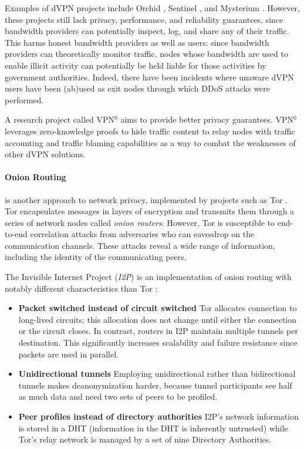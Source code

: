 Examples of dVPN projects include Orchid \cite{orchid}, Sentinel \cite{sentinel}, and Mysterium \cite{mysterium}. However, these projects still lack privacy, performance, and reliability guarantees, since bandwidth providers can potentially inspect, log, and share any of their traffic. This harms honest bandwidth providers as well as users: since bandwidth providers can theoretically monitor traffic, nodes whose bandwidth are used to enable illicit activity can potentially be held liable for those activities by government authorities. Indeed, there have been incidents where unaware dVPN users have been (ab)used as exit nodes through which DDoS attacks
were performed.

A research project called VPN$^0$ \cite{vpn0} aims to provide better privacy guarantees. VPN$^0$ leverages zero-knowledge proofs to hide traffic content to relay nodes with traffic accounting and traffic blaming capabilities as a way to combat the weaknesses of other dVPN solutions.

\paragraph{Onion Routing} is another approach to network privacy, implemented by projects such as Tor \cite{tor}. Tor encapsulates messages in layers of encryption and transmits them through a series of network nodes called \textit{onion routers}. However, Tor is susceptible to end-to-end correlation attacks from adversaries who can eavesdrop on the communication channels. These attacks reveal a wide range of information, including the identity of the communicating peers.

The Invisible Internet Project (\textit{I2P}) is an implementation of onion routing with notably different characteristics than Tor \cite{i2p}:

\begin{itemize}

    \item \textbf{Packet switched instead of circuit switched}
          Tor allocates connection to long-lived circuits; this allocation does not change until either the connection or the circuit closes. In contrast, routers in I2P maintain multiple tunnels per destination. This significantly increases scalability and failure resistance since packets are used in parallel.

    \item \textbf{Unidirectional tunnels}
          Employing unidirectional rather than bidirectional tunnels makes deanonymization harder, because tunnel participants see half as much data and need two sets of peers to be profiled.

    \item \textbf{Peer profiles instead of directory authorities}
          I2P’s network information is stored in a DHT (information in the DHT is inherently untrusted) while Tor’s relay network is managed by a set of nine Directory Authorities.
\end{itemize}

